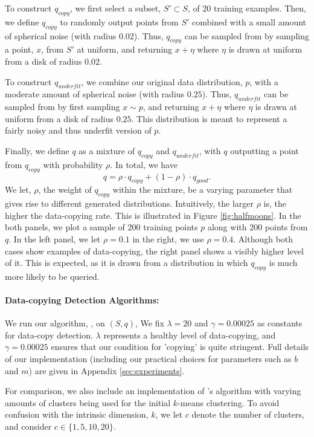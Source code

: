 To construct $q_{copy}$, we first select a subset, $S' \subset S$, of $20$ training examples. Then, we define $q_{copy}$ to randomly output points from $S'$ combined with a small amount of spherical noise (with radius $0.02$). Thus, $q_{copy}$ can be sampled from by sampling a point, $x$, from $S'$ at uniform, and returning $x+\eta$ where $\eta$ is drawn at uniform from a disk of radius $0.02$.

To construct $q_{underfit}$, we combine our original data distribution, $p$, with a moderate amount of spherical noise (with radius $0.25$). Thus, $q_{underfit}$ can be sampled from by first sampling $x \sim p$, and returning $x+ \eta$ where $\eta$ is drawn at uniform from a disk of radius $0.25$. This distribution is meant to represent a fairly noisy and thus underfit version of $p$. 

Finally, we define $q$ as a mixture of $q_{copy}$ and $q_{underfit}$, with $q$ outputting a point from $q_{copy}$ with probability $\rho$. In total, we have $$q = \rho \cdot q_{copy} + (1-\rho) \cdot q_{good}.$$ We let, $\rho$, the weight of $q_{copy}$ within the mixture, be a varying parameter that gives rise to different generated distributions. Intuitively, the larger $\rho$ is, the higher the data-copying rate. This is illustrated in Figure \ref{fig:halfmoons}. In the both panels, we plot a sample of $200$ training points $p$ along with $200$ points from $q$. In the left panel, we let $\rho = 0.1$ in the right, we use $\rho = 0.4$. Although both cases show examples of data-copying, the right panel shows a visibly higher level of it. This is expected, as it is drawn from a distribution in which $q_{copy}$ is much more likely to be queried. 

\paragraph{Data-copying Detection Algorithms:} We run our algorithm, \dc{}, on $(S, q)$, We fix $\lambda = 20$ and $\gamma = 0.00025$ as constants for data-copy detection. $\lambda$ represents a healthy level of data-copying, and $\gamma = 0.00025$ ensures that our condition for 'copying' is quite stringent. Full details of our implementation (including our practical choices for parameters such as $b$ and $m$) are given in Appendix \ref{sec:experiments}.

For comparison, we also include an implementation of \cite{MCD2020}'s algorithm with varying amounts of clusters being used for the initial $k$-means clustering. To avoid confusion with the intrinsic dimension, $k$, we let $c$ denote the number of clusters, and consider $c \in \{1, 5, 10, 20\}$.

